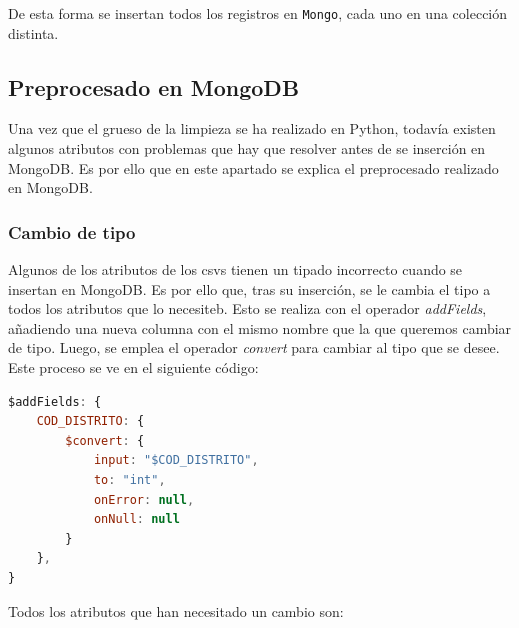 \documentclass[]{article}
\begin{document}
De esta forma se insertan todos los registros en \texttt{Mongo}, cada uno en una colección distinta.

\subsection{Preprocesado en MongoDB}
\label{subsec:preprocessmongo}
Una vez que el grueso de la limpieza se ha realizado en Python, todavía existen algunos atributos con problemas que hay que resolver antes de se inserción en MongoDB. Es por ello que en este apartado se explica el preprocesado realizado en MongoDB.

\subsubsection{Cambio de tipo}
\label{subsubsec:preprocessmongocambiodetipo}

Algunos de los atributos de los csvs tienen un tipado incorrecto cuando se insertan en MongoDB. Es por ello que, tras su inserción, se le cambia el tipo a todos los atributos que lo necesiteb. Esto se realiza con el operador \textit{addFields}, añadiendo una nueva columna con el mismo nombre que la que queremos cambiar de tipo. Luego, se emplea el operador \textit{convert} para cambiar al tipo que se desee. Este proceso se ve en el siguiente código:

\begin{lstlisting}[language=JavaScript, caption=Cambio de tipo genérico]
$addFields: {
    COD_DISTRITO: {
        $convert: {
            input: "$COD_DISTRITO",
            to: "int",
            onError: null,
            onNull: null
        }
    },
}
\end{lstlisting}

Todos los atributos que han necesitado un cambio son:
\end{document}
